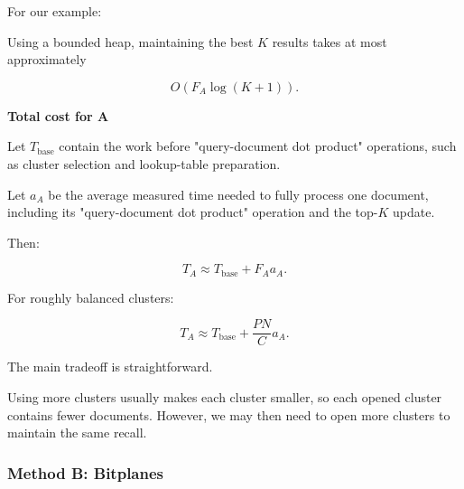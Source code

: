 For our example:

\begin{center}\end{center}

Using a bounded heap, maintaining the best \(K\) results takes at most approximately

\[
O(F_A\log(K+1)).
\]



\textbf{Total cost for A}\par

Let \(T_{\text{base}}\) contain the work before "query-document dot product" operations, such as cluster selection and lookup-table preparation.

Let \(a_A\) be the average measured time needed to fully process one document, including its "query-document dot product" operation and the top-\(K\) update.

Then:

\[
\boxed{
T_A\approx T_{\text{base}}+F_Aa_A.
}
\]

For roughly balanced clusters:

\[
\boxed{
T_A\approx
T_{\text{base}}
+
\frac{PN}{C}a_A.
}
\]

The main tradeoff is straightforward.

Using more clusters usually makes each cluster smaller, so each opened cluster contains fewer documents. However, we may then need to open more clusters to maintain the same recall.

\begin{center}\setlength{\fboxsep}{9pt}\end{center}



\subsubsection{Method B: Bitplanes}

